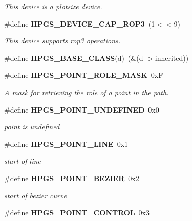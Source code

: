 \begin{DoxyCompactItemize}
\begin{DoxyCompactList}\small\item\em This device is a plotsize device. \item\end{DoxyCompactList}\item 
\#define {\bf HPGS\_\-DEVICE\_\-CAP\_\-ROP3}~(1$<$$<$9)\label{group__device_ga35207578b9faef0e1602a6600c73dd39}

\begin{DoxyCompactList}\small\item\em This device supports rop3 operations. \item\end{DoxyCompactList}\item 
\#define {\bfseries HPGS\_\-BASE\_\-CLASS}(d)~(\&(d-\/$>$inherited))\label{group__device_gad40c8bf92012b37cda89ba8ee69a33a1}

\item 
\#define {\bf HPGS\_\-POINT\_\-ROLE\_\-MASK}~0xF\label{group__path_ga3229deba8d3d400eb35dc5a23ffd8468}

\begin{DoxyCompactList}\small\item\em A mask for retrieving the role of a point in the path. \item\end{DoxyCompactList}\item 
\#define {\bf HPGS\_\-POINT\_\-UNDEFINED}~0x0\label{group__path_ga6d0ec9ff7cda2cb9f20d2f4d915af2cd}

\begin{DoxyCompactList}\small\item\em point is undefined \item\end{DoxyCompactList}\item 
\#define {\bf HPGS\_\-POINT\_\-LINE}~0x1\label{group__path_ga31b0bb74be6c5267fdae0be7bcc72a0c}

\begin{DoxyCompactList}\small\item\em start of line \item\end{DoxyCompactList}\item 
\#define {\bf HPGS\_\-POINT\_\-BEZIER}~0x2\label{group__path_ga71dc1db8502694139211792a33094978}

\begin{DoxyCompactList}\small\item\em start of bezier curve \item\end{DoxyCompactList}\item 
\#define {\bf HPGS\_\-POINT\_\-CONTROL}~0x3\label{group__path_ga197617cc3e882301564d69bda1600cdc}


\end{DoxyCompactItemize}

